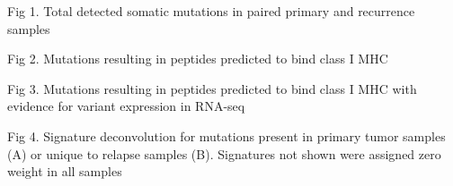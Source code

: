 Fig 1. Total detected somatic mutations in paired primary and recurrence samples

Fig 2. Mutations resulting in peptides predicted to bind class I MHC

Fig 3. Mutations resulting in peptides predicted to bind class I MHC with evidence for variant expression in RNA-seq

Fig 4. Signature deconvolution for mutations present in primary tumor samples (A) or unique to relapse samples (B). Signatures not shown were assigned zero weight in all samples